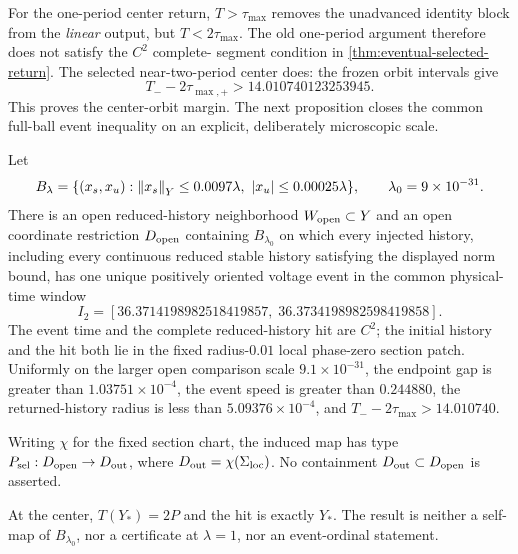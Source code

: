 For the one-period center return, \(T>\tau_{\max}\) removes the unadvanced
identity block from the \emph{linear} output, but \(T<2\tau_{\max}\).  The
old one-period argument therefore does not satisfy the \(C^2\) complete-
segment condition in \cref{thm:eventual-selected-return}.  The selected
near-two-period center does: the frozen orbit intervals give
\begin{equation}
 T_- -2\tau_{\max,+}>14.010740123253945.                \label{eq:two-return-smoothing-margin}
\end{equation}
This proves the center-orbit margin.  The next proposition closes the common
full-ball event inequality on an explicit, deliberately microscopic scale.

\begin{proposition}
\label{prop:explicit-two-period-event-tube}
Let
\[
 B_\lambda=\{(x_s,x_u):\left\lVert x_s\right\rVert_Y\le0.0097\lambda,
                    \ \left\lvert x_u\right\rvert\le0.00025\lambda\},
 \qquad \lambda_0=9\times10^{-31}.
\]
There is an open reduced-history neighborhood \(W_{\rm open}\subset Y\) and
an open coordinate restriction \(D_{\rm open}\) containing
\(B_{\lambda_0}\) on which every injected history, including every
continuous reduced stable history
satisfying the displayed norm bound, has one unique positively oriented
voltage event in the common physical-time window
\begin{equation}
 I_2=[36.3714198982518419857,\;36.3734198982598419858].
                                                               \label{eq:explicit-two-period-window}
\end{equation}
The event time and the complete reduced-history hit are \(C^2\); the initial
history and the hit both lie in the fixed radius-\(0.01\) local phase-zero
section patch.  Uniformly on the larger open comparison scale
\(9.1\times10^{-31}\), the endpoint gap is greater than
\(1.03751\times10^{-4}\), the event speed is greater than
\(0.244880\), the returned-history radius is less than
\(5.09376\times10^{-4}\), and
\(T_--2\tau_{\max}>14.010740\).

Writing \(\chi\) for the fixed section chart, the induced map has type
\(P_{\rm sel}:D_{\rm open}\to D_{\rm out}\), where
\(D_{\rm out}=\chi(\Sigma_{\rm loc})\).  No containment
\(D_{\rm out}\subset D_{\rm open}\) is asserted.

At the center, \(T(Y_*)=2P\) and the hit is exactly \(Y_*\).  The result is
neither a self-map of \(B_{\lambda_0}\), nor a certificate at \(\lambda=1\),
nor an event-ordinal statement.
\end{proposition}

